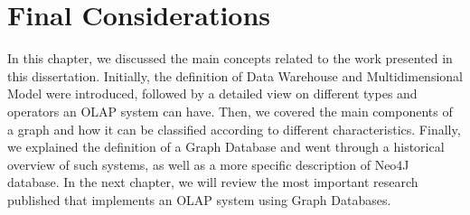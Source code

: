 \section{Final Considerations}
In this chapter, we discussed the main concepts related to the work presented in this dissertation. Initially, the definition of Data Warehouse and Multidimensional Model were introduced, followed by a detailed view on different types and operators an OLAP system can have. Then, we covered the main components of a graph and how it can be classified according to different characteristics. Finally, we explained the definition of a Graph Database and went through a historical overview of such systems, as well as a more specific description of Neo4J database. In the next chapter, we will review the most important research published that implements an OLAP system using Graph Databases.
